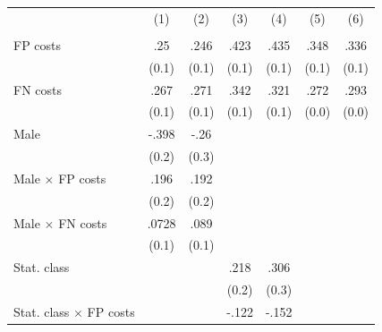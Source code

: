 \begin{tabular}{l*{6}{c}}
\hline\hline
                &\multicolumn{1}{c}{(1)}&\multicolumn{1}{c}{(2)}&\multicolumn{1}{c}{(3)}&\multicolumn{1}{c}{(4)}&\multicolumn{1}{c}{(5)}&\multicolumn{1}{c}{(6)}\\
                &\multicolumn{1}{c}{}&\multicolumn{1}{c}{}&\multicolumn{1}{c}{}&\multicolumn{1}{c}{}&\multicolumn{1}{c}{}&\multicolumn{1}{c}{}\\
\hline
FP costs        &      .25\sym{**} &     .246\sym{**} &     .423\sym{***}&     .435\sym{***}&     .348\sym{***}&     .336\sym{***}\\
                &    (0.1)         &    (0.1)         &    (0.1)         &    (0.1)         &    (0.1)         &    (0.1)         \\
FN costs        &     .267\sym{***}&     .271\sym{***}&     .342\sym{***}&     .321\sym{***}&     .272\sym{***}&     .293\sym{***}\\
                &    (0.1)         &    (0.1)         &    (0.1)         &    (0.1)         &    (0.0)         &    (0.0)         \\
Male            &    -.398\sym{*}  &     -.26         &                  &                  &                  &                  \\
                &    (0.2)         &    (0.3)         &                  &                  &                  &                  \\
Male $\times$ FP costs&     .196         &     .192         &                  &                  &                  &                  \\
                &    (0.2)         &    (0.2)         &                  &                  &                  &                  \\
Male $\times$ FN costs&    .0728         &     .089         &                  &                  &                  &                  \\
                &    (0.1)         &    (0.1)         &                  &                  &                  &                  \\
Stat. class     &                  &                  &     .218         &     .306         &                  &                  \\
                &                  &                  &    (0.2)         &    (0.3)         &                  &                  \\
Stat. class $\times$ FP costs&                  &                  &    -.122         &    -.152         &                  &                  \\

\end{tabular}
